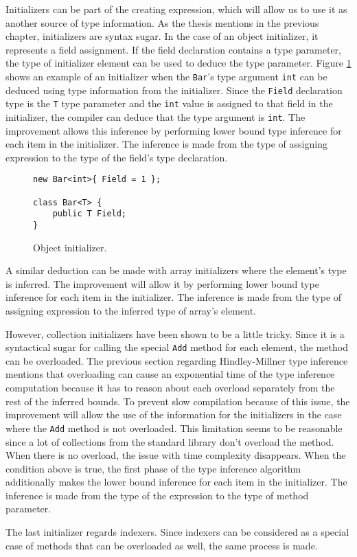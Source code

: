 Initializers can be part of the creating expression, which will allow us to use it as another source of type information. 
As the thesis mentions in the previous chapter, initializers are syntax sugar. 
In the case of an object initializer, it represents a field assignment. 
If the field declaration contains a type parameter, the type of initializer element can be used to deduce the type parameter. 
Figure \ref{img58:initializer} shows an example of an initializer when the \texttt{Bar}’s type argument \texttt{int} can be deduced using type information from the initializer. 
Since the \texttt{Field} declaration type is the \texttt{T} type parameter and the \texttt{int} value is assigned to that field in the initializer, the compiler can deduce that the type argument is \texttt{int}. 
The improvement allows this inference by performing lower bound type inference for each item in the initializer. 
The inference is made from the type of assigning expression to the type of the field’s type declaration.
\begin{figure}[h!]
\begin{lstlisting}[style=csharp, mathescape=true]
new Bar<int>{ Field = 1 };

class Bar<T> {
    public T Field;
}
\end{lstlisting}
\caption{Object initializer.}
\label{img58:initializer}
\end{figure}
\par
A similar deduction can be made with array initializers where the element’s type is inferred.
The improvement will allow it by performing lower bound type inference for each item in the initializer. 
The inference is made from the type of assigning expression to the inferred type of array’s element.
\par
However, collection initializers have been shown to be a little tricky. 
Since it is a syntactical sugar for calling the special \texttt{Add} method for each element, the method can be overloaded. 
The previous section regarding Hindley-Millner type inference mentions that overloading can cause an exponential time of the type inference computation because it has to reason about each overload separately from the rest of the inferred bounds. 
To prevent slow compilation because of this issue, the improvement will allow the use of the information for the initializers in the case where the \texttt{Add} method is not overloaded. 
This limitation seems to be reasonable since a lot of collections from the standard library don’t overload the method. 
When there is no overload, the issue with time complexity disappears. 
When the condition above is true, the first phase of the type inference algorithm additionally makes the lower bound inference for each item in the initializer. 
The inference is made from the type of the expression to the type of method parameter.
\par
The last initializer regards indexers.
Since indexers can be considered as a special case of methods that can be overloaded as well, the same process is made.

